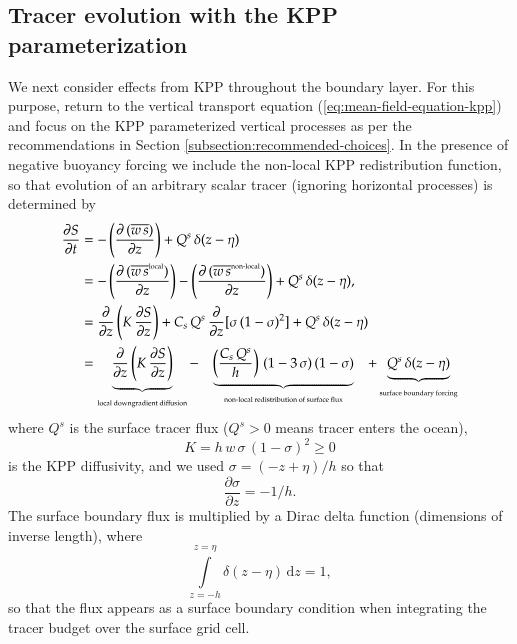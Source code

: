\subsection{Tracer evolution with the KPP parameterization}

We next consider effects from KPP throughout the boundary layer.  For
this purpose, return to the vertical transport equation
(\ref{eq:mean-field-equation-kpp}) and focus on the KPP parameterized
vertical processes as per the recommendations in Section
\ref{subsection:recommended-choices}.  In the presence of negative
buoyancy forcing we include the non-local KPP redistribution function,
so that evolution of an arbitrary scalar tracer (ignoring horizontal
processes) is determined by
\begin{subequations}
\begin{align}
 \frac{\partial S}{\partial t} &= 
 -\left( \frac{\partial \, (\overline{w \, s}) }{\partial z} \right) + Q^{s} \, \delta(z-\eta)
 \\
 &= 
 -\left( \frac{\partial \, (\overline{w \, s}^{\mbox{\tiny local}}) }{\partial z} \right)
 -\left( \frac{\partial \, (\overline{w \, s}^{\mbox{\tiny non-local}}) }{\partial z} \right)
 + Q^{s} \, \delta(z-\eta),
\\
 &= 
   \frac{\partial}{\partial z} \left( K \, \frac{\partial S}{\partial z} \right)
 +C_{s} \, Q^{s} \, \frac{\partial}{\partial z} [\sigma \, (1-\sigma)^{2}]
 + Q^{s} \, \delta(z-\eta)
\\
 &= 
 \underbrace{
 \frac{\partial}{\partial z} \left( K \, \frac{\partial S}{\partial z} \right)
  }_{\mbox{\tiny local downgradient diffusion}}
 - \; \; \; \underbrace{
  \left( \frac{C_{s} \, Q^{s}}{h} \right)  \, (1 - 3 \, \sigma) \, (1-\sigma)
  }_{\mbox{\tiny non-local redistribution of surface flux}} 
 \; \; \; + \underbrace{ Q^{s} \, \delta(z-\eta)}_{\mbox{\tiny surface boundary forcing}}
\label{eq:mean-field-equation-kpp-kernels}
\end{align}
\end{subequations}
where $Q^{s}$ is the surface tracer flux ($Q^{s} > 0$ means
tracer enters the ocean),
\begin{equation}
 K = h \, w \,  \sigma \, (1-\sigma)^{2}  \ge 0 
\end{equation}
is the KPP diffusivity, and we used $\sigma = (-z+\eta)/h$ so that  
\begin{equation}
 \frac{\partial \sigma}{\partial z} = -1/h.
\end{equation}
The surface boundary flux is multiplied by a Dirac delta function
(dimensions of inverse length), where
\begin{equation}
  \int\limits_{z=-h}^{z=\eta} \delta(z-\eta) \, \mathrm{d}z = 1,
\end{equation}
so that the flux appears as a surface boundary condition when
integrating the tracer budget over the surface grid cell.

